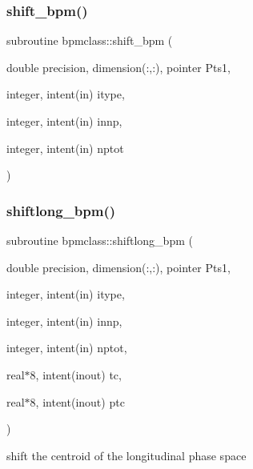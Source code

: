 \mbox{\label{namespacebpmclass_af08cf75c879f797ae8f03ba69e95d628}} 
\subsubsection{\texorpdfstring{shift\_bpm()}{shift\_bpm()}}
{\footnotesize\ttfamily subroutine bpmclass\+::shift\+\_\+bpm (\begin{DoxyParamCaption}\item[{double precision, dimension(\+:,\+:), pointer}]{Pts1,  }\item[{integer, intent(in)}]{itype,  }\item[{integer, intent(in)}]{innp,  }\item[{integer, intent(in)}]{nptot }\end{DoxyParamCaption})}

\mbox{\label{namespacebpmclass_a3103b28e39ab8412e237df545aca9a71}} 
\subsubsection{\texorpdfstring{shiftlong\_bpm()}{shiftlong\_bpm()}}
{\footnotesize\ttfamily subroutine bpmclass\+::shiftlong\+\_\+bpm (\begin{DoxyParamCaption}\item[{double precision, dimension(\+:,\+:), pointer}]{Pts1,  }\item[{integer, intent(in)}]{itype,  }\item[{integer, intent(in)}]{innp,  }\item[{integer, intent(in)}]{nptot,  }\item[{real$\ast$8, intent(inout)}]{tc,  }\item[{real$\ast$8, intent(inout)}]{ptc }\end{DoxyParamCaption})}



shift the centroid of the longitudinal phase space 

\mbox{\label{namespacebpmclass_ac8a2c78d2492dbd541f495bb0fd4840a}} 
